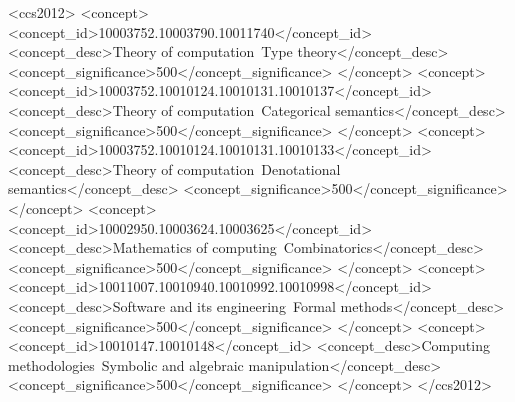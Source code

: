 \documentclass[acmsmall,screen]{acmart}
\begin{document}
\begin{CCSXML}
  <ccs2012>
  <concept>
  <concept_id>10003752.10003790.10011740</concept_id>
  <concept_desc>Theory of computation~Type theory</concept_desc>
  <concept_significance>500</concept_significance>
  </concept>
  <concept>
  <concept_id>10003752.10010124.10010131.10010137</concept_id>
  <concept_desc>Theory of computation~Categorical semantics</concept_desc>
  <concept_significance>500</concept_significance>
  </concept>
  <concept>
  <concept_id>10003752.10010124.10010131.10010133</concept_id>
  <concept_desc>Theory of computation~Denotational semantics</concept_desc>
  <concept_significance>500</concept_significance>
  </concept>
  <concept>
  <concept_id>10002950.10003624.10003625</concept_id>
  <concept_desc>Mathematics of computing~Combinatorics</concept_desc>
  <concept_significance>500</concept_significance>
  </concept>
  <concept>
  <concept_id>10011007.10010940.10010992.10010998</concept_id>
  <concept_desc>Software and its engineering~Formal methods</concept_desc>
  <concept_significance>500</concept_significance>
  </concept>
  <concept>
  <concept_id>10010147.10010148</concept_id>
  <concept_desc>Computing methodologies~Symbolic and algebraic manipulation</concept_desc>
  <concept_significance>500</concept_significance>
  </concept>
  </ccs2012>
\end{CCSXML}




\maketitle
\end{document}
